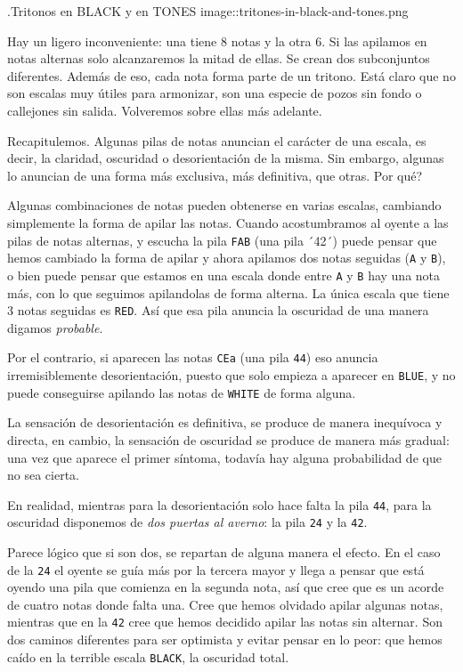 \documentclass[]{report}
\begin{document}
.Tritonos en BLACK y en TONES image::tritones-in-black-and-tones.png

Hay un ligero inconveniente: una tiene 8 notas y la otra 6. Si las apilamos en notas alternas solo alcanzaremos la mitad de ellas. Se crean dos subconjuntos diferentes. Además de eso, cada nota forma parte de un tritono. Está claro que no son escalas muy útiles para armonizar, son una especie de pozos sin fondo o callejones sin salida. Volveremos sobre ellas más adelante.

Recapitulemos. Algunas pilas de notas anuncian el carácter de una escala, es decir, la claridad, oscuridad o desorientación de la misma. Sin embargo, algunas lo anuncian de una forma más exclusiva, más definitiva, que otras. Por qué?

Algunas combinaciones de notas pueden obtenerse en varias escalas, cambiando simplemente la forma de apilar las notas. Cuando acostumbramos al oyente a las pilas de notas alternas, y escucha la pila \texttt{FAB} (una pila ´42´) puede pensar que hemos cambiado la forma de apilar y ahora apilamos dos notas seguidas (\texttt{A} y \texttt{B}), o bien puede pensar que estamos en una escala donde entre \texttt{A} y \texttt{B} hay una nota más, con lo que seguimos apilandolas de forma alterna. La única escala que tiene 3 notas seguidas es \texttt{RED}. Así que esa pila anuncia la oscuridad de una manera digamos \emph{probable}.

Por el contrario, si aparecen las notas \texttt{CEa} (una pila \texttt{44}) eso anuncia irremisiblemente desorientación, puesto que solo empieza a aparecer en \texttt{BLUE}, y no puede conseguirse apilando las notas de \texttt{WHITE} de forma alguna.

La sensación de desorientación es definitiva, se produce de manera inequívoca y directa, en cambio, la sensación de oscuridad se produce de manera más gradual: una vez que aparece el primer síntoma, todavía hay alguna probabilidad de que no sea cierta.

En realidad, mientras para la desorientación solo hace falta la pila \texttt{44}, para la oscuridad disponemos de \emph{dos puertas al averno}: la pila \texttt{24} y la \texttt{42}.

Parece lógico que si son dos, se repartan de alguna manera el efecto. En el caso de la \texttt{24} el oyente se guía más por la tercera mayor y llega a pensar que está oyendo una pila que comienza en la segunda nota, así que cree que es un acorde de cuatro notas donde falta una. Cree que hemos olvidado apilar algunas notas, mientras que en la \texttt{42} cree que hemos decidido apilar las notas sin alternar. Son dos caminos diferentes para ser optimista y evitar pensar en lo peor: que hemos caído en la terrible escala \texttt{BLACK}, la oscuridad total.
\end{document}
